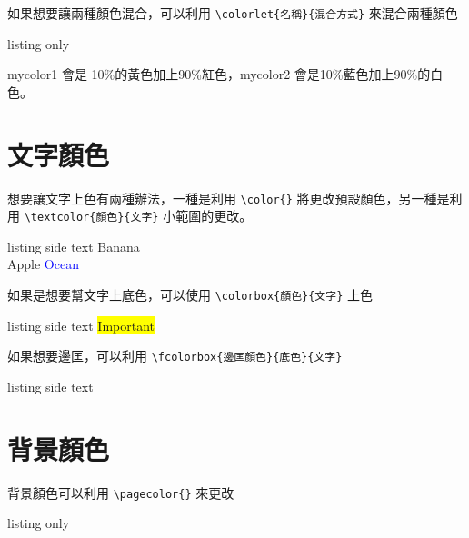 如果想要讓兩種顏色混合，可以利用 \verb|\colorlet{名稱}{混合方式}| 來混合兩種顏色


\begin{tcblisting}{listing only}
\end{tcblisting}

mycolor1 會是 10\%的黃色加上90\%紅色，mycolor2 會是10\%藍色加上90\%的白色。

\section{文字顏色}

想要讓文字上色有兩種辦法，一種是利用 \verb|\color{}| 將更改預設顏色，另一種是利用 \verb|\textcolor{顏色}{文字}| 小範圍的更改。

\begin{tcblisting}{listing side text}
\color{yellow}
Banana\\
\color{red}
Apple \textcolor{blue}{Ocean}
\end{tcblisting}

如果是想要幫文字上底色，可以使用 \verb|\colorbox{顏色}{文字}| 上色

\begin{tcblisting}{listing side text}
\colorbox{yellow}{Important}
\end{tcblisting}

如果想要邊匡，可以利用 \verb|\fcolorbox{邊匡顏色}{底色}{文字}|

\begin{tcblisting}{listing side text}
\\
\end{tcblisting}

\section{背景顏色}

背景顏色可以利用 \verb|\pagecolor{}| 來更改

\begin{tcblisting}{listing only}
\pagecolor{red}
\end{tcblisting}